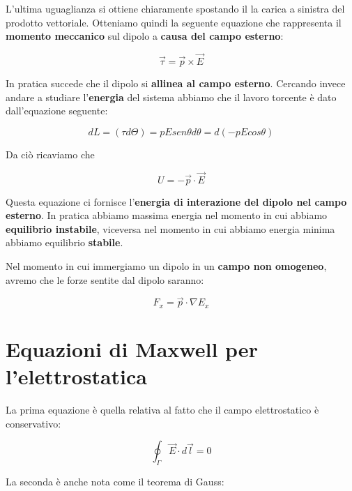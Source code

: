 L'ultima uguaglianza si ottiene chiaramente spostando il la carica a sinistra del prodotto vettoriale. Otteniamo quindi la seguente equazione che rappresenta il \textbf{momento meccanico} sul dipolo a \textbf{causa del campo esterno}: 

\begin{large}
	\begin{equation} \label{eq_tau_dipolo_in_campo_esterno}
		\vec{\tau} = \vec{p} \times \vec{E} 
	\end{equation}
\end{large}

In pratica succede che il dipolo si \textbf{allinea al campo esterno}. Cercando invece andare a studiare l'\textbf{energia} del sistema abbiamo che il lavoro torcente è dato dall'equazione seguente: 

$$ 
dL = (\tau d\Theta)  = p E sen\theta d\theta = d(-pEcos\theta)
$$

Da ciò ricaviamo che 

\begin{large}
	\begin{equation} \label{eq_energia_interazione_campo_dipolo}
		U = -\vec{p} \cdot \vec{E}
	\end{equation}
\end{large}

Questa equazione ci fornisce l'\textbf{energia di interazione del dipolo nel campo esterno}. In pratica abbiamo massima energia nel momento in cui abbiamo \textbf{equilibrio instabile}, viceversa nel momento in cui abbiamo energia minima abbiamo equilibrio \textbf{stabile}.

Nel momento in cui immergiamo un dipolo in un \textbf{campo non omogeneo},  avremo che le forze sentite dal dipolo saranno: 
  
$$
F_x = \vec{p} \cdot \nabla E_x
$$

\section{Equazioni di Maxwell per l'elettrostatica}

La prima equazione è quella relativa al fatto che il campo elettrostatico è conservativo: 

\begin{equation} \label{eq_maxwell_campo_conservativo}
	\oint_\Gamma \vec{E} \cdot d\vec{l} = 0
\end{equation}

La seconda è anche nota come il teorema di Gauss: 

